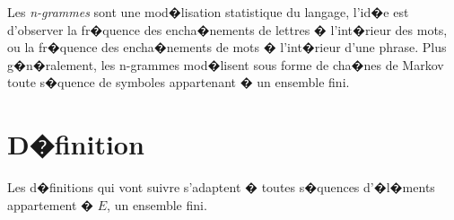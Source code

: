 
\firstpassagedo{}

\firstpassagedo{}


Les \emph{n-grammes} sont une mod�lisation statistique du langage, l'id�e est d'observer la
fr�quence des encha�nements de lettres � l'int�rieur des mots, ou la fr�quence des encha�nements de mots � l'int�rieur
d'une phrase. Plus g�n�ralement, les n-grammes mod�lisent sous forme de cha�nes de Markov toute s�quence de symboles appartenant � un ensemble fini.


\label{annexe_ngrams}









\section{D�finition}

Les d�finitions qui vont suivre s'adaptent � toutes s�quences d'�l�ments appartement � $E$, un ensemble fini.

